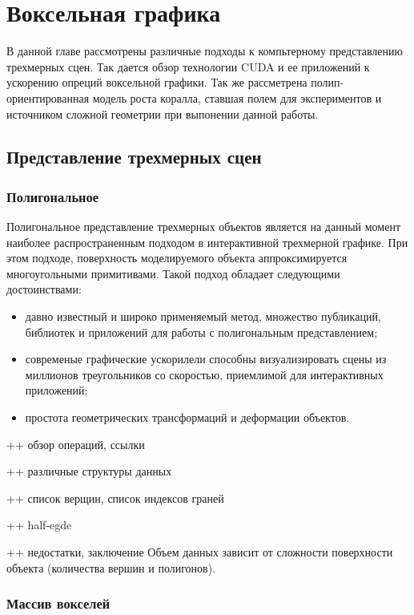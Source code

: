 \chapter{Воксельная графика}

В данной главе рассмотрены различные подходы к компьтерному представлению трехмерных сцен. Так дается обзор технологии CUDA и ее приложений к ускорению опреций воксельной графики. Так же рассметрена полип-ориентированная модель роста коралла, ставшая полем для экспериментов и источником сложной геометрии при выпонении данной работы.

\section{Представление трехмерных сцен}
\subsection{Полигональное}

Полигональное представление трехмерных объектов является на данный момент наиболее распространенным подходом в интерактивной трехмерной графике. При этом подходе, поверхность моделируемого объекта аппроксимируется многоугольными примитивами. Такой подход обладает следующими достоинствами:

\begin{itemize}
\item давно известный и широко применяемый метод, множество публикаций, библиотек и приложений для работы с полигональным представлением;
\item современые графические ускорилели способны визуализировать сцены из миллионов треугольников со скоростью, приемлимой для интерактивных приложений;
\item простота геометрических трансформаций и деформации объектов.
\end{itemize}

++ обзор операций, ссылки

++ различные структуры данных

++ список верщин, список индексов граней

++ half-egde

++ недостатки, заключение
Объем данных зависит от сложности поверхности объекта (количества вершин и полигонов).

\subsection{Массив вокселей}

